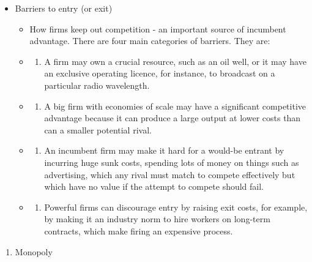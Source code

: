\documentclass[11pt,]{book}
\providecommand{\tightlist}{%
  \setlength{\itemsep}{0pt}\setlength{\parskip}{0pt}}
\theoremstyle{definition}
\theoremstyle{definition}
\theoremstyle{definition}
\theoremstyle{remark}
\begin{document}
\begin{itemize}
\tightlist
\item
  Barriers to entry (or exit)

  \begin{itemize}
  \item
    How firms keep out competition - an important source of incumbent
    advantage. There are four main categories of barriers. They are:
  \item
    \begin{enumerate}
    \def\labelenumi{\arabic{enumi}.}
    \tightlist
    \item
      A firm may own a crucial resource, such as an oil well, or it may
      have an exclusive operating licence, for instance, to broadcast on
      a particular radio wavelength.
    \end{enumerate}
  \item
    \begin{enumerate}
    \def\labelenumi{\arabic{enumi}.}
    \setcounter{enumi}{1}
    \tightlist
    \item
      A big firm with economies of scale may have a significant
      competitive advantage because it can produce a large output at
      lower costs than can a smaller potential rival.
    \end{enumerate}
  \item
    \begin{enumerate}
    \def\labelenumi{\arabic{enumi}.}
    \setcounter{enumi}{2}
    \tightlist
    \item
      An incumbent firm may make it hard for a would-be entrant by
      incurring huge sunk costs, spending lots of money on things such
      as advertising, which any rival must match to compete effectively
      but which have no value if the attempt to compete should fail.
    \end{enumerate}
  \item
    \begin{enumerate}
    \def\labelenumi{\arabic{enumi}.}
    \setcounter{enumi}{3}
    \tightlist
    \item
      Powerful firms can discourage entry by raising exit costs, for
      example, by making it an industry norm to hire workers on
      long-term contracts, which make firing an expensive process.
    \end{enumerate}
  \end{itemize}
\end{itemize}

\begin{enumerate}
\def\labelenumi{\arabic{enumi}.}
\setcounter{enumi}{2}
\tightlist
\item
  Monopoly
\end{enumerate}
\end{document}
